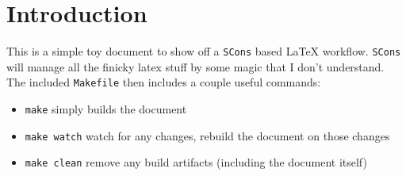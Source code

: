 \section{Introduction}
This is a simple toy document to show off a \texttt{SCons} based \LaTeX{} workflow.
\texttt{SCons} will manage all the finicky latex stuff by some magic that I don't
understand. The included \texttt{Makefile} then includes a couple useful commands:
\begin{itemize}
  \item
   \texttt{make} simply builds the document
  \item
    \texttt{make watch} watch for any changes, rebuild the document on those changes
  \item
    \texttt{make clean} remove any build artifacts (including the document itself)
\end{itemize}

